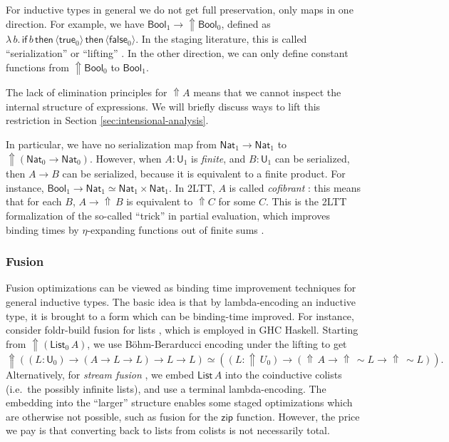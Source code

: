 \documentclass[acmsmall,screen]{acmart}
\newcommand{\msf}[1]{\mathsf{#1}}
\newcommand{\Lift}{{\Uparrow}}
\newcommand{\spl}{{\sim}}
\newcommand{\qut}[1]{\langle #1\rangle}
\newcommand{\U}{\msf{U}}
\newcommand{\Bool}{\msf{Bool}}
\newcommand{\true}{\msf{true}}
\newcommand{\false}{\msf{false}}
\newcommand{\List}{\msf{List}}
\newcommand{\Nat}{\msf{Nat}}
\theoremstyle{remark}
\begin{document}
For inductive types in general we do not get full preservation, only maps in one
direction. For example, we have $\Bool_1 \to \Lift \Bool_0$, defined as
$\lambda\,b.\,\msf{if}\,b\,\msf{then}\,\qut{\true_0}\,\msf{then}\,\qut{\false_0}$.
In the staging literature, this is called ``serialization'' or ``lifting''
\cite{template-haskell,metaml}.  In the other direction, we can only define
constant functions from $\Lift \Bool_0$ to $\Bool_1$.

The lack of elimination principles for $\Lift A$ means that we cannot inspect
the internal structure of expressions. We will briefly discuss ways to lift this
restriction in Section \ref{sec:intensional-analysis}.

In particular, we have no serialization map from $\Nat_1 \to \Nat_1$ to
$\Lift(\Nat_0 \to \Nat_0)$. However, when $A : \U_1$ is \emph{finite}, and $B :
\U_1$ can be serialized, then $A \to B$ can be serialized, because it is
equivalent to a finite product. For instance, $\Bool_1 \to \Nat_1 \simeq \Nat_1
\times \Nat_1$.  In 2LTT, $A$ is called \emph{cofibrant}
\cite[Section~3.4]{twolevel}: this means that for each $B$, $A \to \Lift\,B$ is
equivalent to $\Lift C$ for some $C$. This is the 2LTT formalization of the
so-called ``trick'' in partial evaluation, which improves binding times by
$\eta$-expanding functions out of finite sums \cite{eta-expansion-trick}.

\subsubsection{Fusion}
Fusion optimizations can be viewed as binding time improvement techniques for
general inductive types. The basic idea is that by lambda-encoding an inductive
type, it is brought to a form which can be binding-time improved. For instance,
consider foldr-build fusion for lists \cite{short-cut}, which is employed in GHC
Haskell.  Starting from $\Lift (\List_0\,A)$, we use Böhm-Berarducci encoding
\cite{boehm-berarducci} under the lifting to get
\[ \Lift((L : \U_0) \to (A \to L \to L) \to L \to L) \simeq ((L : \Lift\,U_0) \to (\Lift\,A \to \Lift\,\spl L \to \Lift\,\spl L)). \]
Alternatively, for \emph{stream fusion} \cite{stream-fusion}, we embed $\List\,A$ into the
coinductive colists (i.e.\ the possibly infinite lists), and use a terminal
lambda-encoding. The embedding into the ``larger'' structure enables some staged
optimizations which are otherwise not possible, such as fusion for the
$\msf{zip}$ function. However, the price we pay is that converting
back to lists from colists is not necessarily total.
\end{document}
